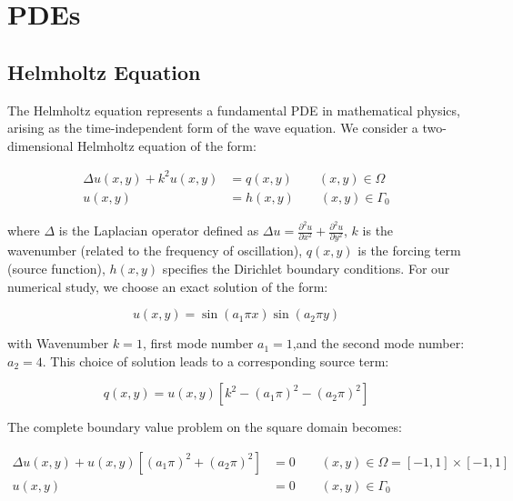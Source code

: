 \section{PDEs}
\label{app:appendix_b}

\subsection{Helmholtz Equation}
The Helmholtz equation represents a fundamental PDE in mathematical physics, arising as the time-independent form of the wave equation. We consider a two-dimensional Helmholtz equation of the form:

\begin{eqnarray}
    \Delta u(x,y) + k^2u(x,y) &= q(x,y) \qquad (x,y) \in \Omega   \\ 
    u(x,y) &= h(x,y) \qquad (x,y) \in \Gamma_0
\end{eqnarray}

\noindent where $\Delta$ is the Laplacian operator defined as $\Delta u = \frac{\partial^2 u}{\partial x^2} + \frac{\partial^2 u}{\partial y^2}$,  $k$ is the wavenumber (related to the frequency of oscillation), $q(x,y)$ is the forcing term (source function), $h(x,y)$ specifies the Dirichlet boundary conditions.
For our numerical study, we choose an exact solution of the form:

\begin{equation}
    u(x,y) = \sin(a_1\pi x)\sin(a_2\pi y)
\end{equation}

\noindent  with Wavenumber $k = 1$, first mode number $a_1 = 1$,and the  second mode number: $a_2 = 4$. This choice of solution leads to a corresponding source term:

\begin{equation}
    q(x,y) = u(x,y)[k^2 - (a_1\pi)^2 - (a_2\pi)^2]
\end{equation}

\noindent The complete boundary value problem on the square domain becomes:

\begin{equation}
\begin{split}
        \Delta u(x,y) + u(x,y)[(a_1\pi)^2 + (a_2\pi)^2] &= 0 \qquad (x,y) \in \Omega = [-1,1]\times[-1,1]\\ 
        u(x,y) &= 0 \qquad (x,y) \in \Gamma_0 
\end{split}
\label{eq:Helmholtz} 
\end{equation}


